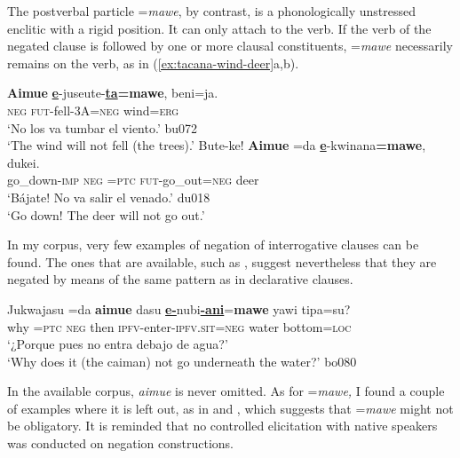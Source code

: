 \documentclass[output=paper]{langsci/langscibook}
\begin{document}
The postverbal particle =\textit{mawe}, by contrast, is a phonologically
unstressed enclitic with a rigid position. It can only attach to the verb.
If the verb of the negated clause is followed by one or more clausal
constituents, =\textit{mawe} necessarily remains on the verb, as in
(\ref{ex:tacana-wind-deer}a,b).

\begin{exe}\ex
\label{ex:tacana-wind-deer}      
\begin{xlist}
\ex\label{ex:tacana-wind}
\gll \textbf{Aimue} \textbf{\uline{e}}-juseute-\textbf{\uline{ta}=}\textbf{mawe}, beni=ja.\\
    \textsc{neg}  \textsc{fut}-fell-3A=\textsc{neg}  wind=\textsc{erg}\\
\glt `No los va tumbar el viento.' bu072\\
`The wind will not fell (the trees).'
\ex\label{ex:tacana-deer}          
\gll  Bute-ke!  \textbf{Aimue}  =da \textbf{\uline{e}}-kwinana\textbf{=mawe}, dukei.\\
    go\_down-\textsc{imp}  \textsc{neg}  \textsc{=ptc}
    \textsc{fut}-go\_out=\textsc{neg}  deer\\
\glt `Bájate! No va salir el venado.' du018\\
`Go down! The deer will not go out.'
\end{xlist}\end{exe}

In my corpus, very few examples of negation of interrogative clauses can be
found. The ones that are available, such as , suggest
nevertheless that they are negated by means of the same pattern as in declarative clauses.

\begin{exe}\ex
\label{ex:tacana-caiman}  
\gll Jukwajasu  =da  \textbf{aimue}  dasu
\textbf{\uline{e-}}nubi\textbf{\uline{-ani}}=\textbf{mawe} {\ob}yawi
tipa=su{\cb}?\\
 why  =\textsc{ptc}  \textsc{neg}  then
 \textsc{ipfv}-enter-\textsc{ipfv.sit}=\textsc{neg}  water
 bottom=\textsc{loc}\\
\glt `¿Porque pues no entra debajo de agua?'\\
`Why does it (the caiman) not go underneath the water?' bo080
\end{exe}

In the available corpus, \textit{aimue} is never omitted. As for
=\textit{mawe,} I found a couple of examples where it is left out, as in
 and , which suggests
that =\textit{mawe} might not be obligatory. It is reminded that no
controlled elicitation with native speakers was conducted on negation
constructions.
\end{document}
